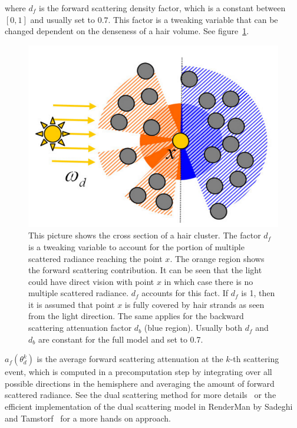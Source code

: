where $d_f$ is the forward scattering density factor, which is a constant between $[0, 1]$ and usually set to $0.7$. This factor is a tweaking variable that can be changed dependent on the denseness of a hair volume. See figure~\ref{fig_df}.

\begin{figure}[h]
\begin{center}
\includegraphics[scale=0.2]{relatedwork/dualscattering_df.png}
\end{center}
\caption{This picture shows the cross section of a hair cluster. The factor $d_f$ is a tweaking variable to account for the portion of multiple scattered radiance reaching the point $x$. The orange region shows the forward scattering contribution. It can be seen that the light could have direct vision with point $x$ in which case there is no multiple scattered radiance. $d_f$ accounts for this fact. If $d_f$ is 1, then it is assumed that point $x$ is fully covered by hair strands as seen from the light direction. The same applies for the backward scattering attenuation factor $d_b$ (blue region). Usually both $d_f$ and $d_b$ are constant for the full model and set to 0.7.}
\label{fig_df}
\end{figure}


$a_f(\theta_d^k)$ is the average forward scattering attenuation at the $k$-th scattering event, which is computed in a precomputation step by integrating over all possible directions in the hemisphere and averaging the amount of forward scattered radiance. See the dual scattering method for more details~\cite{zinke} or the efficient implementation of the dual scattering model in RenderMan by Sadeghi and Tamstorf~\cite{sadeghi} for a more hands on approach.

